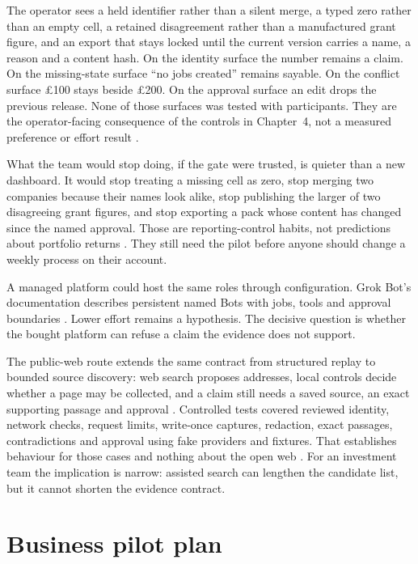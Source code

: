 The operator sees a held identifier rather than a silent merge, a typed zero rather than an
empty cell, a retained disagreement rather than a manufactured grant figure, and an export that
stays locked until the current version carries a name, a reason and a content hash. On the
identity surface the number remains a claim. On the missing-state surface ``no jobs created''
remains sayable. On the conflict surface \pounds100 stays beside \pounds200. On the approval
surface an edit drops the previous release. None of those surfaces was tested with
participants. They are the operator-facing consequence of the controls in Chapter~4, not a
measured preference or effort result \citep{amershi2019guidelines,bucinca2021forcing}.

What the team would stop doing, if the gate were trusted, is quieter than a new dashboard. It would
stop treating a missing cell as zero, stop merging two companies because their names look alike, stop
publishing the larger of two disagreeing grant figures, and stop exporting a pack whose content has
changed since the named approval. Those are reporting-control habits, not predictions about
portfolio returns \citep{fca2024promotions,nikiforova2020quality}. They still need the pilot before
anyone should change a weekly process on their account.

A managed platform could host the same roles through configuration. Grok Bot's documentation
describes persistent named Bots with jobs, tools and approval boundaries
\citep{spacexai2026grokbot,dibia2024autogenstudio}. Lower effort remains a hypothesis. The decisive
question is whether the bought platform can refuse a claim the evidence does not support.

The public-web route extends the same contract from structured replay to bounded source discovery:
web search proposes addresses, local controls decide whether a page may be collected, and a claim
still needs a saved source, an exact supporting passage and approval
\citep{openai2026websearch,gao2023alce}. Controlled tests covered reviewed identity, network checks,
request limits, write-once captures, redaction, exact passages, contradictions and approval using fake
providers and fixtures. That establishes behaviour for those cases and nothing about the open web
\citep{greshake2023indirect,nist2023airmf}. For an investment team the implication is narrow: assisted
search can lengthen the candidate list, but it cannot shorten the evidence contract.

\section{Business pilot plan}
\label{sec:business-pilot}

